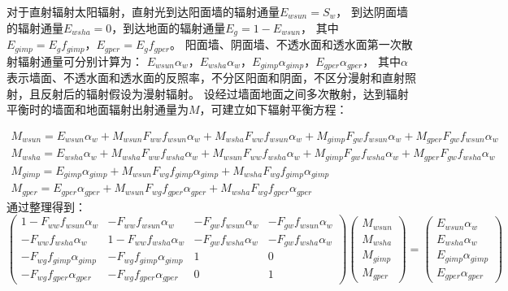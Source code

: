 对于直射辐射太阳辐射，直射光到达阳面墙的辐射通量$E_{wsun}=S_w$，
到达阴面墙的辐射通量$E_{wsha}=0$，到达地面的辐射通量$E_g=1-E_{wsun}$，
其中$E_{gimp}=E_gf_{gimp}$，$E_{gper}=E_gf_{gper}$。
阳面墙、阴面墙、不透水面和透水面第一次散射辐射通量可分别计算为：
$E_{wsun}\alpha_w，E_{wsha}\alpha_w，E_{gimp}\alpha_{gimp}，E_{gper}\alpha_{gper}$，
其中$\alpha$表示墙面、不透水面和透水面的反照率，不分区阳面和阴面，不区分漫射和直射照射，且反射后的辐射假设为漫射辐射。
设经过墙面地面之间多次散射，达到辐射平衡时的墙面和地面辐射出射通量为$M$，可建立如下辐射平衡方程：
\begin{landscape}
\begin{equation}
\begin{array}{l}
    M_{ {wsun }}=E_{wsun} \alpha_{w}+M_{wsun} F_{ww} f_{wsun} \alpha_{w}+M_{wsha} F_{ww} f_{wsun} \alpha_{w}+M_{gimp} F_{g w} f_{wsun} \alpha_{w}+M_{gper} F_{g w} f_{wsun} \alpha_{w} \\ 
    M_{wsha}=E_{wsha} \alpha_{w}+M_{wsha} F_{ww} f_{wsha} \alpha_{w}+M_{wsun} F_{ww} f_{wsha} \alpha_{w}+M_{gimp} F_{g w} f_{wsha} \alpha_{w}+M_{gper} F_{g w} f_{wsha} \alpha_{w} \\ 
    M_{gimp}=E_{gimp} \alpha_{gimp}+M_{wsun} F_{w g} f_{ gimp} \alpha_{gimp}+M_{wsha} F_{w g} f_{ gimp} \alpha_{gimp} \\ 
    M_{gper}=E_{gper} \alpha_{gper}+M_{wsun} F_{w g} f_{gper} \alpha_{gper}+M_{wsha} F_{w g} f_{gper} \alpha_{gper}
\end{array}
\end{equation}
通过整理得到：
\begin{equation}
\left(\begin{array}{cccc}1-F_{ww} f_{wsun} \alpha_{w} & -F_{ww} f_{wsun} \alpha_{w} & -F_{g w} f_{wsun} \alpha_{w} & -F_{g w} f_{wsun} \alpha_{w} \\
    -F_{ww} f_{wsha} \alpha_{w} & 1-F_{ww} f_{wsha} \alpha_{w} & -F_{g w} f_{wsha} \alpha_{w} & -F_{g w} f_{wsha} \alpha_{w} \\
    -F_{w g} f_{gimp} \alpha_{gimp} & -F_{w g} f_{gimp} \alpha_{gimp} & 1 & 0 \\ 
    -F_{w g} f_{gper} \alpha_{gper} & -F_{w g} f_{gper} \alpha_{gper} & 0 & 1\end{array}\right)
    \left(\begin{array}{l}M_{wsun} \\ M_{ {wsha }} \\ 
    M_{ gimp} \\ 
    M_{gper}\end{array}\right)=\left(\begin{array}{c}E_{wsun} \alpha_{w} \\
    E_{wsha} \alpha_{w} \\
    E_{gimp} \alpha_{ gimp} \\
    E_{gper} \alpha_{gper}\end{array}\right)
\end{equation}
\end{landscape}

